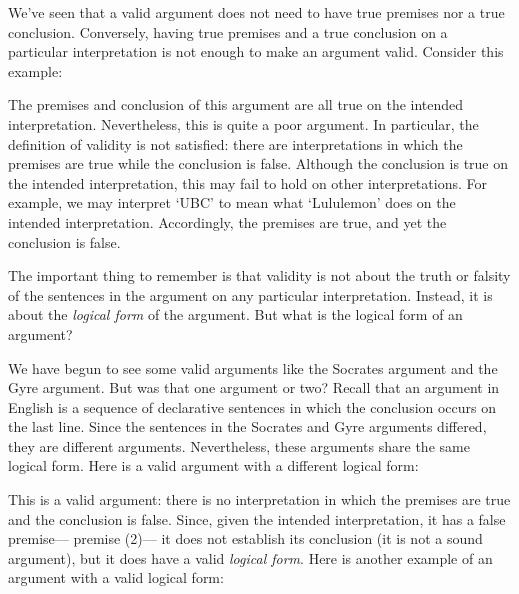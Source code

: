 We've seen that a valid argument does not need to have true premises nor a true conclusion.
Conversely, having true premises and a true conclusion on a particular interpretation is not enough to make an argument valid.
Consider this example:

\begin{earg}
\end{earg}

The premises and conclusion of this argument are all true on the intended interpretation.
Nevertheless, this is quite a poor argument.
In particular, the definition of validity is not satisfied: there are interpretations in which the premises are true while the conclusion is false.
Although the conclusion is true on the intended interpretation, this may fail to hold on other interpretations.
For example, we may interpret `UBC' to mean what `Lululemon' does on the intended interpretation.
Accordingly, the premises are true, and yet the conclusion is false.

The important thing to remember is that validity is not about the truth or falsity of the sentences in the argument on any particular interpretation. 
Instead, it is about the \textit{logical form} of the argument.
But what is the logical form of an argument?

We have begun to see some valid arguments like the Socrates argument and the Gyre argument.
But was that one argument or two?
Recall that an argument in English is a sequence of declarative sentences in which the conclusion occurs on the last line.
Since the sentences in the Socrates and Gyre arguments differed, they are different arguments.
Nevertheless, these arguments share the same logical form.
Here is a valid argument with a different logical form:

\begin{earg}
\end{earg}

This is a valid argument: there is no interpretation in which the premises are true and the conclusion is false.
Since, given the intended interpretation, it has a false premise--- premise (2)--- it does not establish its conclusion (it is not a sound argument), but it does have a valid \emph{logical form}.
Here is another example of an argument with a valid logical form:


